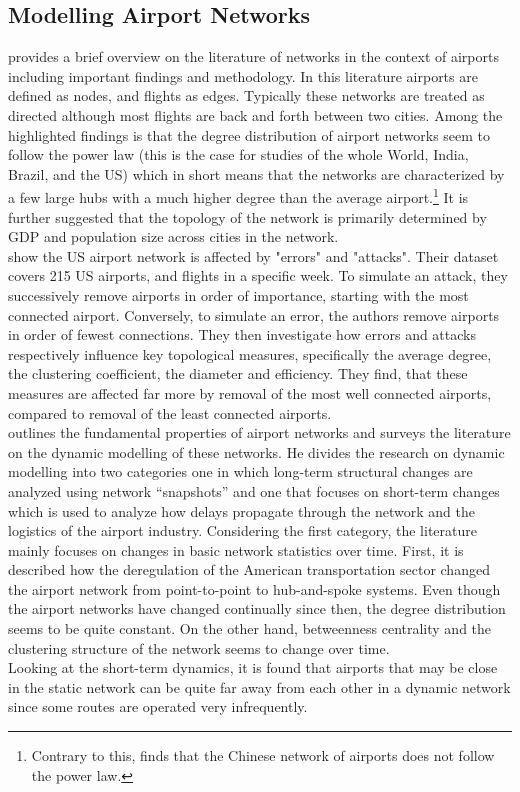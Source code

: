 \subsection{Modelling Airport Networks}
\citet[pp. 41-42]{costa2011analyzing} provides a brief overview on the literature of networks in the context of airports including important findings and methodology. In this literature airports are defined as nodes, and flights as edges. Typically these networks are treated as directed although most flights are back and forth between two cities. Among the highlighted findings is that the degree distribution of airport networks seem to follow the power law (this is the case for studies of the whole World, India, Brazil, and the US) which in short means that the networks are characterized by a few large hubs with a much higher degree than the average airport.\footnote{Contrary to this, \citet{he2004statistics} finds that the Chinese network of airports does not follow the power law.} It is further suggested that the topology of the network is primarily determined by GDP and population size across cities in the network. \\

\citet{chi2004structural} show the US airport network is affected by "errors" and "attacks". Their dataset covers 215 US airports, and flights in a specific week. To simulate an attack, they successively remove airports in order of importance, starting with the most connected airport. Conversely, to simulate an error, the authors remove airports in order of fewest connections. They then investigate how errors and attacks respectively influence key topological measures, specifically the average degree, the clustering coefficient, the diameter and efficiency. They find, that these measures are affected far more by removal of the most well connected airports, compared to removal of the least connected airports. \\

\citet{rocha2017dynamics} outlines the fundamental properties of airport networks and surveys the literature on the dynamic modelling of these networks. He divides the research on dynamic modelling into two categories one in which long-term structural changes are analyzed using network ``snapshots'' and one that focuses on short-term changes which is used to analyze how delays propagate through the network and the logistics of the airport industry. Considering the first category, the literature mainly focuses on changes in basic network statistics over time. First, it is described how the deregulation of the American transportation sector changed the airport network from point-to-point to hub-and-spoke systems. Even though the airport networks have changed continually since then, the degree distribution seems to be quite constant. On the other hand, betweenness centrality and the clustering structure of the network seems to change over time. \\
Looking at the short-term dynamics, it is found that airports that may be close in the static network can be quite far away from each other in a dynamic network since some routes are operated very infrequently.  


